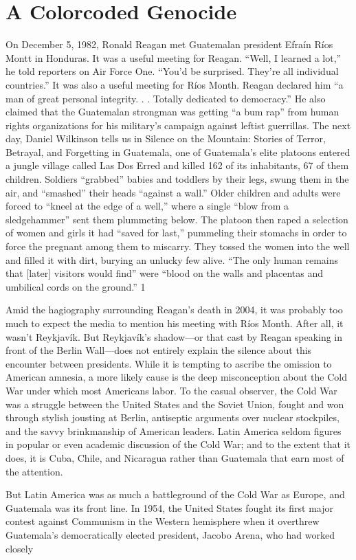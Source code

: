 {\chapter{A Colorcoded Genocide} } {\label{A Colorcoded Genocide} }{\par}{\textit{	} } {\par}{\par} {\textbf{\textit{	} } } {\par} 
	On December 5, 1982, Ronald Reagan met Guatemalan president Efraín Ríos Montt in Honduras. It was a useful meeting for Reagan. “Well, I learned a lot,” he told reporters on Air Force One. “You’d be surprised. They’re all individual countries.” It was also a useful meeting for Ríos Month. Reagan declared him “a man of great personal integrity. . . Totally dedicated to democracy.” He also claimed that the Guatemalan strongman was getting “a bum rap” from human rights organizations for his military’s campaign against leftist guerrillas. The next day, Daniel Wilkinson tells us in Silence on the Mountain: Stories of Terror, Betrayal, and Forgetting in Guatemala, one of Guatemala’s elite platoons entered a jungle village called Las Dos Erred and killed {\color{blue} 162 } of its inhabitants, {\color{blue} 67 } of them children. Soldiers “grabbed” babies and toddlers by their legs, swung them in the air, and “smashed” their heads “against a wall.” Older children and adults were forced to “kneel at the edge of a well,” where a single “blow from a sledgehammer” sent them plummeting below. The platoon then raped a selection of women and girls it had “saved for last,” pummeling their stomachs in order to force the pregnant among them to miscarry. They tossed the women into the well and filled it with dirt, burying an unlucky few alive. “The only human remains that [later] visitors would find” were “blood on the walls and placentas and umbilical cords on the ground.” {\color{blue} 1 } {\par} Amid the hagiography surrounding Reagan’s death in 2004, it was probably too much to expect the media to mention his meeting with Ríos Month. After all, it wasn’t Reykjavík. But Reykjavík’s shadow—or that cast by Reagan speaking in front of the Berlin Wall—does not entirely explain the silence about this encounter between presidents. While it is tempting to ascribe the omission to American amnesia, a more likely cause is the deep misconception about the Cold War under which most Americans labor. To the casual observer, the Cold War was a struggle between the United States and the Soviet Union, fought and won through stylish jousting at Berlin, antiseptic arguments over nuclear stockpiles, and the savvy brinkmanship of American leaders. Latin America seldom figures in popular or even academic discussion of the Cold War; and to the extent that it does, it is Cuba, Chile, and Nicaragua rather than Guatemala that earn most of the attention.{\par} But Latin America was as much a battleground of the Cold War as Europe, and Guatemala was its front line. In 1954, the United States fought its first major contest against Communism in the Western hemisphere when it overthrew Guatemala’s democratically elected president, Jacobo Arena, who had worked closely 